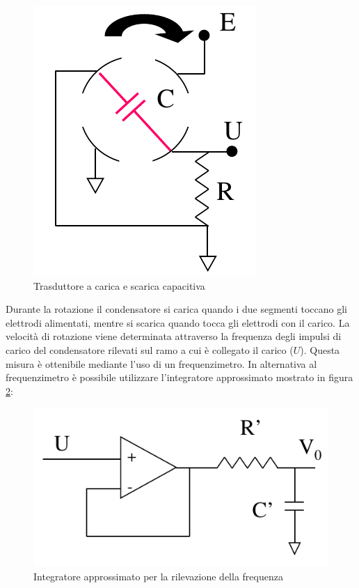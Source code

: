 \begin{figure}[htbp]
	\centering
	\includegraphics[scale=0.5]
			{img/caricascaricacapacitiva.png}
	\caption{Trasduttore a carica e scarica capacitiva
\label{fig:carscarcap}}
\end{figure}

Durante la rotazione il condensatore si carica quando i due segmenti
toccano gli elettrodi alimentati, mentre si scarica quando tocca gli
elettrodi con il carico. La velocità di rotazione viene determinata
attraverso la frequenza degli impulsi di carico del condensatore
rilevati sul ramo a cui è collegato il carico ($U$). Questa misura è
ottenibile mediante l'uso di un frequenzimetro. In alternativa al
frequenzimetro è possibile utilizzare l'integratore approssimato
mostrato in figura \ref{fig:carscarint}:

\begin{figure}[htbp]
	\centering
	\includegraphics[scale=0.5]
			{img/caricascaricaintegra.png}
	\caption{Integratore approssimato per la rilevazione della
frequenza
\label{fig:carscarint}}
\end{figure}

